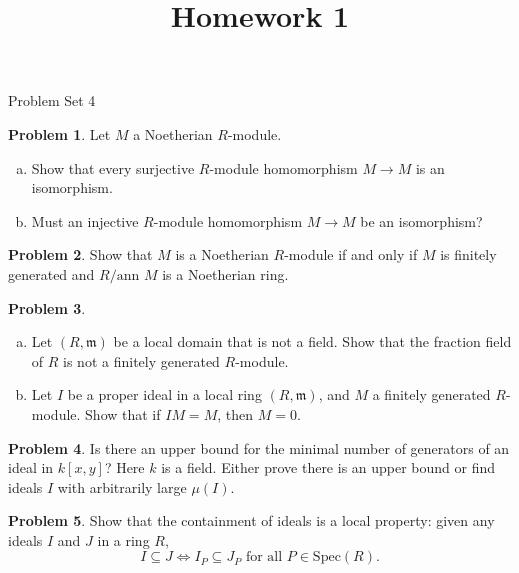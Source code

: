 \documentclass[11pt]{article}
\title{}
\date{\vspace{-0.5in}}
\title{Homework 1}
\theoremstyle{definition}
\newtheorem{problem}{Problem}
\begin{document}
\thispagestyle{fancy}
\pagestyle{fancy}


\begin{center}
	{\LARGE Problem Set 4}
\end{center}


\begin{problem}
	Let $M$ a Noetherian $R$-module. 
	
	\begin{enumerate}[a)]
	\item Show that every surjective $R$-module homomorphism $M \longrightarrow M$ is an isomorphism.
	\item Must an injective $R$-module homomorphism $M \longrightarrow M$ be an isomorphism?
	\end{enumerate}
\end{problem}

\begin{problem}
	Show that $M$ is a Noetherian $R$-module if and only if $M$ is finitely generated and $R/\textrm{ann } M$ is a Noetherian ring.
\end{problem}

\begin{problem}$\,$
\begin{enumerate}[a)]
	\item Let $(R, \mathfrak{m})$ be a local domain that is not a field. Show that the fraction field of $R$ is not a finitely generated $R$-module.
	\item Let $I$ be a proper ideal in a local ring $(R, \mathfrak{m})$, and $M$ a finitely generated $R$-module. Show that if $IM = M$, then $M = 0$.
\end{enumerate}
	\end{problem}


\begin{problem}
	Is there an upper bound for the minimal number of generators of an ideal in $k[x,y]$? Here $k$ is a field. Either prove there is an upper bound or find ideals $I$ with arbitrarily large $\mu(I)$.
\end{problem}



\begin{problem}
	Show that the containment of ideals is a local property: given any ideals $I$ and $J$ in a ring $R$,
	$$I \subseteq J \Longleftrightarrow I_P \subseteq J_P \textrm{ for all } P \in \textrm{Spec}(R).$$	
\end{problem}
\end{document}
